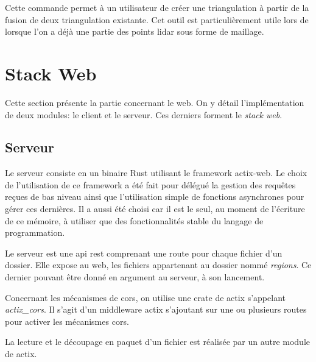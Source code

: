 Cette commande permet à un utilisateur de créer une triangulation à
partir de la fusion de deux triangulation existante. Cet outil est
particulièrement utile lors de lorsque l'on a déjà une partie des points lidar
sous forme de maillage.
\section{Stack Web}

Cette section présente la partie concernant le web. On y détail l'implémentation
de deux modules: le client et le serveur.
Ces derniers forment le \textit{stack web}.

\subsection{Serveur}

Le serveur consiste en un binaire Rust utilisant le framework actix-web.
Le choix de l'utilisation de ce framework a été fait pour délégué la gestion des
requêtes reçues de bas niveau ainsi que l'utilisation simple de fonctions
asynchrones pour gérer ces dernières.
Il a aussi été choisi car il est le seul, au moment de l'écriture de ce mémoire,
à utiliser que des fonctionnalités stable du langage de programmation.

Le serveur est une \gls{api} \gls{rest} comprenant une route pour chaque fichier
d'un dossier.
Elle expose au web, les fichiers appartenant au dossier nommé \textit{regions}.
Ce dernier pouvant être donné en argument au serveur, à son lancement.

Concernant les mécanismes de \gls{cors}, on utilise une crate de actix
s'appelant \textit{actix\_cors}.
Il s'agit d'un middleware actix s'ajoutant sur une ou plusieurs routes pour
activer les mécanismes \gls{cors}.

La lecture et le découpage en paquet d'un fichier est réalisée par un autre
module de actix.

